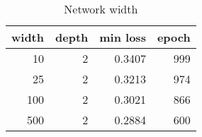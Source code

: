 \begin{table}
\centering
\caption{Network width}
\label{tab:width}
\begin{tabular}{rrrr}
\toprule
 width &  depth &  min loss &  epoch \\
\midrule
    10 &      2 &    0.3407 &    999 \\
    25 &      2 &    0.3213 &    974 \\
   100 &      2 &    0.3021 &    866 \\
   500 &      2 &    0.2884 &    600 \\
\bottomrule
\end{tabular}
\end{table}
